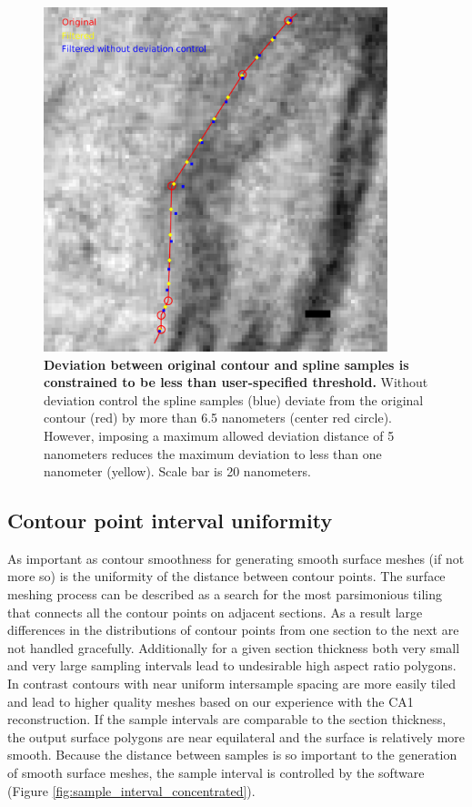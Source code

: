 \documentclass[12pt]{article}
\begin{document}
\begin{figure}[htb]
  \begin{center}
    \includegraphics[width=10cm]{figures/deviation_control.pdf}
    \caption{\textbf{Deviation between original contour and spline
    samples is constrained to be less than user-specified threshold.}
    Without deviation control the spline samples (blue) deviate from
    the original contour (red) by more than 6.5 nanometers (center red
    circle). However, imposing a maximum allowed deviation distance of 5
    nanometers reduces the maximum deviation to less than one nanometer
    (yellow). Scale bar is 20 nanometers.} \label{fig:deviation_control}
  \end{center}
\end{figure}

\subsection{Contour point interval uniformity}

As important as contour smoothness for generating smooth surface meshes
(if not more so) is the uniformity of the distance between contour
points. The surface meshing process can be described as a search for
the most parsimonious tiling that connects all the contour points on
adjacent sections. As a result large differences in the distributions
of contour points from one section to the next are not handled
gracefully. Additionally for a given section thickness both very small
and very large sampling intervals lead to undesirable high aspect ratio
polygons. In contrast contours with near uniform intersample spacing
are more easily tiled and lead to higher quality meshes based on our
experience with the CA1 reconstruction. If the sample intervals are
comparable to the section thickness, the output surface polygons are
near equilateral and the surface is relatively more smooth. Because the
distance between samples is so important to the generation of smooth
surface meshes, the sample interval is controlled by the software
(Figure \ref{fig:sample_interval_concentrated}).
\end{document}
